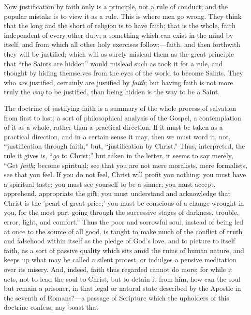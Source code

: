 Now justification by faith only is a principle, not a rule of
conduct; and the popular mistake is to view it as a rule. This is
where men go wrong. They think that the long and the short of religion
is to have faith; that is the whole, faith independent of every other
duty; a something which can exist in the mind by itself, and
from which all other holy exercises follow;—faith, and then
forthwith they will be justified; which will as surely mislead them as
the great principle that ``the Saints are hidden'' would
mislead such as took it for a rule, and thought by hiding themselves
from the eyes of the world to become Saints. They who \emph{are}
justified, certainly are justified by \emph{faith}; but having faith
is not more truly the \emph{way} to be justified, than being hidden is
the way to be a Saint.

The doctrine of justifying faith is a summary of the whole process
of salvation from first to last; a sort of philosophical analysis of
the Gospel, a contemplation of it as a whole, rather than a practical
direction. If it must be taken as a practical direction, and in a
certain sense it may, then we must word it, not, ``justification
through faith,'' but, ``justification by Christ.'' Thus,
interpreted, the rule it gives is, ``\emph{go} to Christ;''
but taken in the letter, it seems to say merely, ``Get \emph{faith};
become spiritual; see that you are not mere moralists, mere
formalists, see that you feel. If you do not feel, Christ will profit
you nothing: you must have a spiritual taste; you must see yourself to
be a sinner; you must accept, apprehend, appropriate the gift; you
must understand and acknowledge that Christ is the 'pearl of great
price;' you must be conscious of a change wrought in you, for the most
part going through the successive stages of darkness, trouble, error,
light, and comfort.'' Thus the poor and sorrowful soul, instead of
being led at once to the source of all good, is taught to make much of
the conflict of truth and falsehood within itself as the pledge
of God's love, and to picture to itself faith, as a sort of passive
quality which sits amid the ruins of human nature, and keeps up what
may be called a silent protest, or indulges a pensive meditation over
its misery. And, indeed, faith thus regarded cannot do more; for while
it acts, not to lead the soul to Christ, but to detain it from him,
how can the soul but remain a prisoner, in that legal or natural state
described by the Apostle in the seventh of Romans?—a passage of
Scripture which the upholders of this doctrine confess, nay boast that
